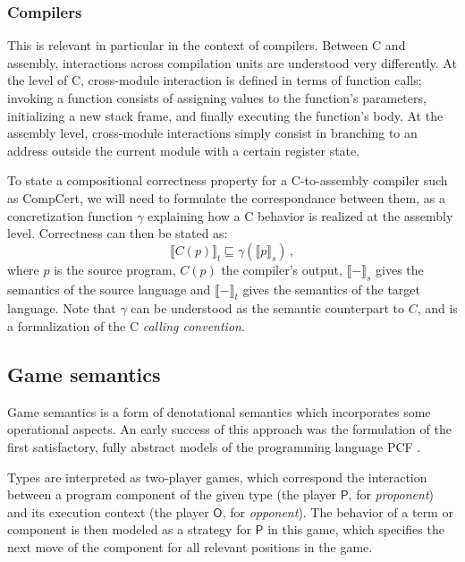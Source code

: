 \documentclass[acmsmall,timestamp,review,anonymous]{acmart}
\newcommand{\kw}[1]{\ensuremath{ \mathsf{#1} }}
\begin{document}

\subsubsection{Compilers} %

This is relevant in particular
in the context of compilers.
Between C and assembly,
interactions across compilation units
are understood very differently.
At the level of C,
cross-module interaction is defined in terms of
function calls;
invoking a function consists of assigning values
to the function's parameters,
initializing a new stack frame,
and finally executing the function's body.
At the assembly level, cross-module
interactions simply consist in branching to an address
outside the current module with
a certain register state.

To state a compositional correctness property for a C-to-assembly compiler
such as CompCert,
we will need to formulate the correspondance between them,
as a concretization function $\gamma$
explaining how a C behavior is realized at the assembly level.
Correctness can then be stated as:
\[ \llbracket C(p) \rrbracket_t \sqsubseteq
   \gamma(\llbracket p \rrbracket_s) \,, \]
where
$p$ is the source program, $C(p)$ the compiler's output,
$\llbracket - \rrbracket_s$ gives the semantics of the source language and
$\llbracket - \rrbracket_t$ gives the semantics of the target language.
Note that $\gamma$ can be understood as the semantic counterpart to $C$,
and is a formalization of the C \emph{calling convention}.



\subsection{Game semantics} %


Game semantics is a form of denotational semantics which
incorporates some operational aspects.
An early success of this approach was
the formulation of the first satisfactory, fully abstract models
of the programming language PCF \cite{pcfajm,pcfho}.

Types are interpreted as two-player games,
which correspond the interaction
between a program component of the given type
(the player \kw{P}, for \emph{proponent})
and its execution context
(the player \kw{O}, for \emph{opponent}).
The behavior of a term or component
is then modeled as a strategy for \kw{P} in this game,
which specifies the next move of the component
for all relevant positions in the game.
\end{document}
